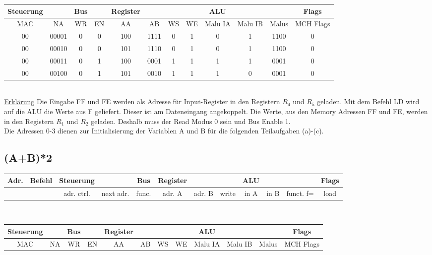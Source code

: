 \documentclass[paper=a4, fontsize=11pt]{scrartcl}
\numberwithin{equation}{section}
\numberwithin{figure}{section}
\numberwithin{table}{section}
\begin{document}
\begin{tabular}{|cc|cc|cccc|ccc|c|}
\hline
Steuerung & & Bus & & Register & & & & ALU & & & Flags \\
\hline
MAC & NA & WR & EN & AA & AB & WS & WE & Malu IA & Malu IB & Malus & MCH Flags \\
\hline
00 & 00001 & 0 & 0 & 100 & 1111 & 0 & 1 & 0 & 1 & 1100 & 0  \\
\hline
00 & 00010 & 0 & 0 & 101 & 1110 & 0 & 1 & 0 & 1 & 1100 & 0 \\
\hline
00 & 00011 & 0 & 1 & 100 & 0001 & 1 & 1 & 1 & 1 & 0001 & 0 \\
\hline
00 & 00100 & 0 & 1 & 101 & 0010 & 1 & 1 & 1 & 0 & 0001 & 0 \\
\hline
\end{tabular} \\

\underline{Erklärung}
Die Eingabe FF und FE werden als Adresse für Input-Register in den Registern $R_{4}$ und $R_{5}$ geladen. Mit dem Befehl LD wird auf die ALU die Werte aus F geliefert. Dieser ist am Dateneingang angekoppelt. Die Werte, aus den Memory Adressen FF und FE, werden in den Registern $R_{1}$ und $R_{2}$ geladen. Deshalb muss der Read Modus 0 sein und Bus Enable 1. \\

Die Adressen 0-3 dienen zur Initialisierung der Variablen A und B für die folgenden Teilaufgaben (a)-(c).


\subsection{(A+B)*2}

\begin{tabular}{|c|c|cc|c|ccc|ccc|c|}
\hline
Adr. & Befehl &Steuerung & & Bus & Register & & & ALU & & & Flags \\
\hline
& & adr. ctrl. & next adr. & func. & adr. A & adr. B & write & in A & in B & funct. f= & load \\
\hline
\end{tabular} \\

\begin{tabular}{|cc|cc|cccc|ccc|c|}
\hline
Steuerung & & Bus & & Register & & & & ALU & & & Flags \\
\hline
MAC & NA & WR & EN & AA & AB & WS & WE & Malu IA & Malu IB & Malus & MCH Flags \\
\hline
\end{tabular} \\
\end{document}

